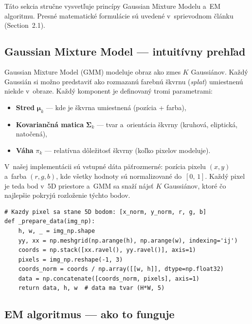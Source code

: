 \documentclass[a4paper,11pt]{article}
\begin{document}
Táto sekcia stručne vysvetľuje princípy Gaussian Mixture Modelu a~EM
algoritmu.  Presné matematické formulácie sú uvedené v~sprievodnom
článku (Section~2.1).

\subsection{Gaussian Mixture Model --- intuitívny prehľad}
\label{subsec:gmm_def}

Gaussian Mixture Model (GMM) modeluje obraz ako zmes $K$ Gaussiánov.
Každý Gaussián si možno predstaviť ako rozmazanú farebnú škvrnu (\emph{splat})
umiestnenú niekde v~obraze.  Každý komponent je definovaný tromi
parametrami:
\begin{itemize}[nosep]
  \item \textbf{Stred} $\bm{\mu}_k$ --- kde je škvrna umiestnená
        (pozícia + farba),
  \item \textbf{Kovariančná matica} $\bm{\Sigma}_k$ --- tvar a~orientácia
        škvrny (kruhová, eliptická, natočená),
  \item \textbf{Váha} $\pi_k$ --- relatívna dôležitosť škvrny
        (koľko pixelov modeluje).
\end{itemize}

V~našej implementácii sú vstupné dáta päťrozmerné: pozícia pixelu
$(x, y)$ a~farba $(r, g, b)$, kde všetky hodnoty sú normalizované
do~$[0,\,1]$.  Každý pixel je teda bod v~5D priestore a~GMM
sa snaží nájsť $K$ Gaussiánov, ktoré čo najlepšie pokryjú rozloženie
týchto bodov.

\begin{lstlisting}
# Kazdy pixel sa stane 5D bodom: [x_norm, y_norm, r, g, b]
def _prepare_data(img_np):
    h, w, _ = img_np.shape
    yy, xx = np.meshgrid(np.arange(h), np.arange(w), indexing='ij')
    coords = np.stack([xx.ravel(), yy.ravel()], axis=1)
    pixels = img_np.reshape(-1, 3)
    coords_norm = coords / np.array([[w, h]], dtype=np.float32)
    data = np.concatenate([coords_norm, pixels], axis=1)
    return data, h, w  # data ma tvar (H*W, 5)
\end{lstlisting}

\subsection{EM algoritmus --- ako to funguje}
\label{subsec:em_alg}
\end{document}
